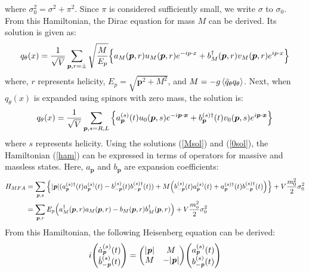         where $\sigma_0^2 = \sigma^2 + \pi^2$. Since $\pi$ is considered sufficiently small, we write $\sigma$ to $\sigma_0$.  
        From this Hamiltonian, the Dirac equation for mass $M$ can be derived. Its solution is given as:  
        \begin{eqnarray}
            \label{Msol}
            q_\theta (x)=\frac{1}{\sqrt{V}}\sum_{\bm{p},r=\pm} \sqrt{\frac{M}{E_p}}\qty{a_M(\bm{p},r)u_M(\bm{p},r)e^{-ip\cdot x}+b_M^{\dag}(\bm{p},r)v_M(\bm{p},r)e^{ip\cdot x}}
        \end{eqnarray}
        where, $r$ represents helicity, $E_p = \sqrt{\bm{p}^2 + M^2}$, and $M = -g\ev{\bar{q}_\theta q_\theta}$.  
        Next, when $q_\theta(x)$ is expanded using spinors with zero mass, the solution is:  
        \begin{eqnarray}
            \label{0sol}
            q_\theta (x)=\frac{1}{\sqrt{V}}\sum_{\bm{p},s=R,L}\qty{a_{\bm{p}}^{(s)}(t)u_0(\bm{p},s)e^{-i\bm{p}\cdot \bm{x}}+b_{\bm{p}}^{(s)\dag}(t)v_0(\bm{p},s)e^{i\bm{p}\cdot \bm{x}}}
        \end{eqnarray}
        where $s$ represents helicity.  
        Using the solutions (\ref{Msol}) and (\ref{0sol}), the Hamiltonian (\ref{ham}) can be expressed in terms of operators for massive and massless states. Here, $a_{\bm{p}}$ and $b_{\bm{p}}$ are expansion coefficients:  
        \begin{align}
            \label{hamenzan}
            H_{MFA}&=\sum_{\textbf{\textit{p}},s} \qty{|\textbf{\textit{p}}|(a_{\textbf{\textit{p}}}^{(s)\dag}(t) a_{\textbf{\textit{p}}}^{(s)}(t)-b_{-\textbf{\textit{p}}}^{(s)}(t)
            b_{-\textbf{\textit{p}}}^{(s)\dag}(t))+M\qty(b_{-\textbf{\textit{p}}}^{(s)} (t)a_{\textbf{\textit{p}}}^{(s)}(t)+a_{\textbf{\textit{p}}}^{(s)\dag}(t) b_{-\textbf{\textit{p}}}^{(s)\dag}(t))} +V \frac{m_0^2}{2}\sigma_0^2 \\
            \label{massfinite}
            &=\sum_{\bm{p},r}E_p\qty(a^\dagger_M(\bm{p},r)a_M(\bm{p},r)-b_M(\bm{p},r)b^\dagger_M(\bm{p},r))+V\frac{m_o^2}{2}\sigma_0^2
        \end{align}
        From this Hamiltonian, the following Heisenberg equation can be derived:  
        \begin{eqnarray}
            \label{massless_Heisenberg_e.q.}
            i \mqty(\dot{a}_{\textbf{\textit{p}}}^{(s)}(t)\\\dot{b}_{-\textbf{\textit{p}}}^{(s)}(t))=\mqty(|\textbf{\textit{p}}|&M\\M&-|\textbf{\textit{p}}|)\mqty(a_{\textbf{\textit{p}}}^{(s)}(t)\\b_{-\textbf{\textit{p}}}^{(s)}(t))
        \end{eqnarray}

